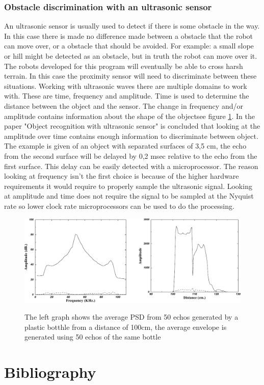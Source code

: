 \documentclass[10pt,a4paper]{article}
\begin{document}
\subsubsection{Obstacle discrimination with an ultrasonic sensor}
An ultrasonic sensor is usually used to detect if there is some obstacle in the way. In this case there is made no difference made between a obstacle that the robot can move over, or a obstacle that should be avoided. For example: a small slope or hill might be detected as an obstacle, but in truth the robot can move over it. The robots developed for this program will eventually be able to cross harsh terrain. In this case the proximity sensor will need to discriminate between these situations. Working with ultrasonic waves there are multiple domains to work with. These are time, frequency and amplitude. Time is used to determine the distance between the object and the sensor. The change in frequency and/or amplitude contains information about the shape of the object\cite{ultraobject}see figure \ref{ultrafreq}. In the paper "Object recognition with ultrasonic sensor" is concluded that looking at the amplitude over time contains enough information to discriminate between object\cite{ultraobject}. The example is given of an object with separated surfaces of 3,5 cm, the echo from the second surface will be delayed by 0,2 msec relative to the echo from the first surface. This delay can be easily detected with a microprocessor. The reason looking at frequency isn't the first choice is because of the higher hardware requirements it would require to properly sample the ultrasonic signal. Looking at amplitude and time does not require the signal to be sampled at the Nyquist rate so lower clock rate microprocessors can be used to do the processing.
\\
\begin{figure}[h]

  \centering
      \includegraphics[width=1\textwidth]{ultrafreq.pdf}
  \caption{The left graph shows the average PSD from 50 echos generated by a plastic botthle from a distance of 100cm, the average envelope is generated using 50 echos of the same bottle} \cite{ultraobject}  \label{ultrafreq}
 
\end{figure}


\newpage

\section{Bibliography}


\end{document}
